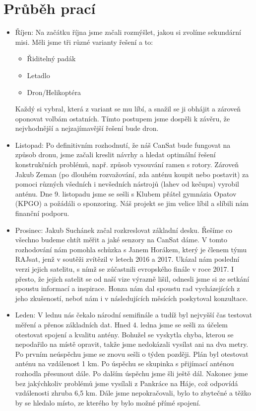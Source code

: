 \documentclass[a4paper]{report}
\begin{document}
\section{Průběh prací}
\begin{itemize}
\item Říjen: Na začátku října jsme začali rozmýšlet, jakou si zvolíme sekundární misi. Měli jsme tři různé varianty řešení a to:
\begin{itemize}
\item Řiditelný padák
\item Letadlo
\item Dron/Helikoptéra
\end{itemize}
Každý si vybral, která z variant se mu líbí, a snažil se ji obhájit a zároveň oponovat volbám ostatních. Tímto postupem jsme dospěli k závěru, že nejvhodnější a nejzajímavější řešení bude dron.
\item Listopad: Po definitivním rozhodnutí, že náš CanSat bude fungovat na způsob dronu, jsme začali kreslit návrhy a hledat optimální řešení konstrukčních problémů, např. způsob vysouvání ramen s rotory. Zároveň Jakub Zeman (po dlouhém rozvažování, zda anténu koupit nebo postavit) za pomoci různých všedních i nevšedních nástrojů (lahev od kečupu) vyrobil anténu. Dne 9. listopadu jsme se sešli s Klubem přátel gymnázia Opatov (KPGO) a požádáli o sponzoring. Náš projekt se jim velice líbil a slíbili nám finanční podporu.
\item Prosinec: Jakub Suchánek začal rozkreslovat základní desku. Řešíme co všechno budeme chtít měřit a jaké senzory na CanSat dáme. V tomto rozhodování nám pomohla schůzka s Janem Horákem, který je členem týmu RAJsat, jenž v soutěži zvítězil v letech 2016 a 2017. Ukázal nám poslední verzi jejich satelitu, s nímž se zúčastnili evropského finále v roce 2017. I přesto, že jejich satelit se od naší vize výrazně lišil, odnesli jsme si ze setkání spoustu informací a inspirace. Honza nám dal spoustu rad vycházejících z jeho zkušeností, neboť nám i v následujících měsících poskytoval konzultace.
\item Leden: V lednu nás čekalo národní semifinále a tudíž byl nejvyšší čas testovat měření a přenos základních dat. Hned 4. ledna jsme se sešli za účelem otestovat spojení a kvalitu antény. Bohužel se vyskytla chyba, kterou se nepodařilo na místě opravit, takže jsme nedokázali vysílat ani na dva metry. Po prvním neúspěchu jsme se znovu sešli o týden později. Plán byl otestovat anténu na vzdálenost 1 km. Po úspěchu se skupinka s přijímací anténou rozhodla přesunout dále. Po dalším úspěchu jsme šli ještě dál. Nakonec jsme bez jakýchkoliv problémů jsme vysílali z Pankráce na Háje, což odpovídá vzdálenosti zhruba 6,5 km. Dále jsme nepokračovali, bylo to zbytečné a těžko by se hledalo místo, ze kterého by bylo možné přímé spojení.

\end{itemize}
\end{document}
